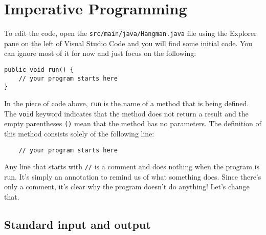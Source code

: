 \section*{Imperative Programming}

To edit the code, open the \texttt{src/main/java/Hangman.java} file using the Explorer pane on the left of Visual Studio Code and you will find some initial code. You can ignore most of it for now and just focus on the following:
\begin{verbatim}
public void run() {
    // your program starts here
}
\end{verbatim}
In the piece of code above, \texttt{run} is the name of a method that is being defined. The \texttt{void} keyword indicates that the method does not return a result and the empty parentheses \texttt{()} mean that the method has no parameters. The definition of this method consists solely of the following line:
\begin{verbatim}
    // your program starts here
\end{verbatim}
Any line that starts with \texttt{//} is a comment and does nothing when the program is run. It's simply an annotation to remind us of what something does. Since there's only a comment, it's clear why the program doesn't do anything! Let's change that.

\subsection*{Standard input and output} 


